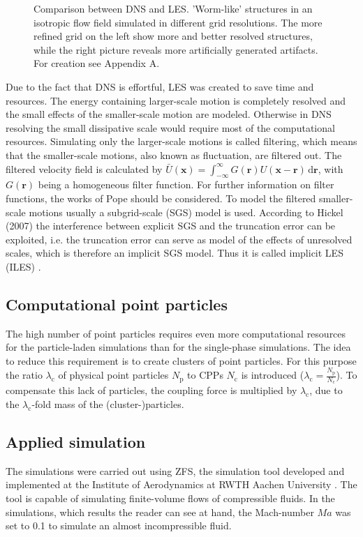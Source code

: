 \documentclass[11pt,a4paper,openany,oneside,parskip=half*]{article}
\renewcommand*\vec[1]{\boldsymbol{#1}}
\begin{document}
\begin{figure}[h]
\begin{minipage}[t]{0.5\textwidth}
        \label{64_velocity}
    \end{minipage}
    \captionsetup{width=0.97\linewidth}
\caption{Comparison between DNS and LES. 'Worm-like' structures in an isotropic flow field simulated in different grid resolutions. The more refined grid on the left show more and better resolved structures, while the right picture reveals more artificially generated artifacts. For creation see Appendix A.}
\end{figure}
Due to the fact that DNS is effortful, LES was created to save time and resources. The energy containing larger-scale motion is completely resolved and the small effects of the smaller-scale motion are modeled. Otherwise in DNS resolving the small dissipative scale would require most of the computational resources.
\newline
Simulating only the larger-scale motions is called filtering, which means that the smaller-scale motions, also known as fluctuation, are filtered out. The filtered velocity field is calculated by $\bar U(\vec{x}) = \int_{-\infty}^{\infty} G(\vec{r})U(\vec{x} - \vec{r})  \, \mathrm{d}\vec{r}$, with $G(\vec{r}) $ being a homogeneous filter function. For further information on filter functions, the works of Pope \cite{turbulentFlows} should be considered. To model the filtered smaller-scale motions usually a subgrid-scale (SGS) model is used. According to Hickel (2007) the interference between explicit SGS and the truncation error can be exploited, i.e. the truncation error can serve as model of the effects of unresolved scales, which is therefore an implicit SGS model. Thus it is called implicit LES (ILES) \cite{implicitLES}. 
\subsection{Computational point particles}
The high number of point particles requires even more computational resources for the particle-laden simulations than for the single-phase simulations. The idea to reduce this requirement is to create clusters of point particles. For this purpose the ratio $\lambda_\mathrm{c}$ of physical point particles $N_\mathrm{p}$ to CPPs $N_\mathrm{c}$ is introduced ($\lambda_\mathrm{c} = \frac{N_\mathrm{p}}{N_\mathrm{c}}$). To compensate this lack of particles, the coupling force is multiplied by $\lambda_\mathrm{c}$, due to the $\lambda_\mathrm{c}$-fold mass of the (cluster-)particles.
\newline
\subsection{Applied simulation}
The simulations were carried out using ZFS, the simulation tool developed and implemented at the Institute of Aerodynamics at RWTH Aachen University 
\cite{anAdaptiveMultilevelMultigridFormulationForCartesianHierarchicalGridMethods} \cite{aStrictlyConservativeCartesianCutCellMethodForCompressibleViscousFlowsOnAdaptiveGrids}. 
The tool is capable of simulating finite-volume flows of compressible fluids. In the simulations, which results the reader can see at hand, the Mach-number $Ma$ was set to 0.1 to simulate an almost incompressible fluid.
\pagebreak
\end{document}
